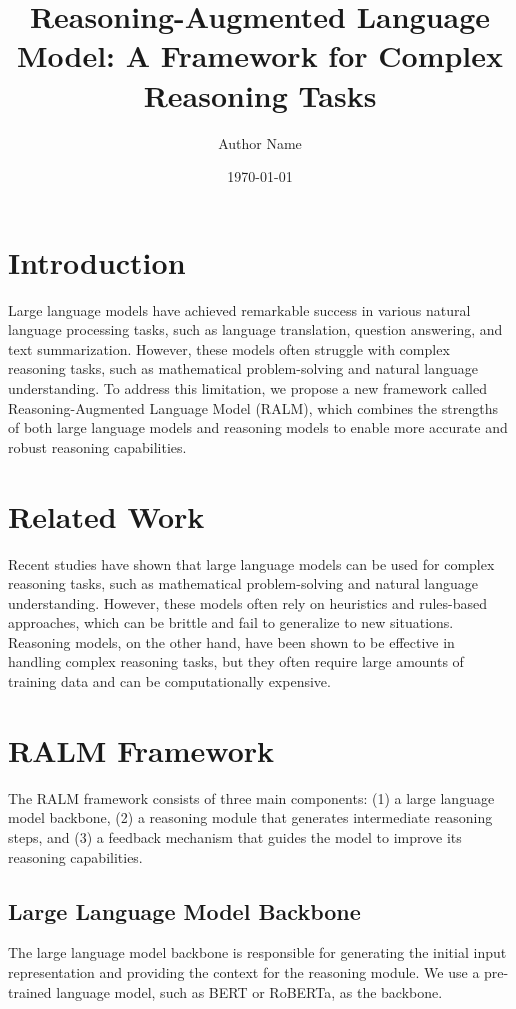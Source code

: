 \documentclass{article}
\title{Reasoning-Augmented Language Model: A Framework for Complex Reasoning Tasks}
\author{Author Name}
\date{\today}
\begin{document}
\maketitle

\section{Introduction}

Large language models have achieved remarkable success in various natural language processing tasks, such as language translation, question answering, and text summarization. However, these models often struggle with complex reasoning tasks, such as mathematical problem-solving and natural language understanding. To address this limitation, we propose a new framework called Reasoning-Augmented Language Model (RALM), which combines the strengths of both large language models and reasoning models to enable more accurate and robust reasoning capabilities.

\section{Related Work}

Recent studies have shown that large language models can be used for complex reasoning tasks, such as mathematical problem-solving and natural language understanding. However, these models often rely on heuristics and rules-based approaches, which can be brittle and fail to generalize to new situations. Reasoning models, on the other hand, have been shown to be effective in handling complex reasoning tasks, but they often require large amounts of training data and can be computationally expensive.

\section{RALM Framework}

The RALM framework consists of three main components: (1) a large language model backbone, (2) a reasoning module that generates intermediate reasoning steps, and (3) a feedback mechanism that guides the model to improve its reasoning capabilities.

\subsection{Large Language Model Backbone}

The large language model backbone is responsible for generating the initial input representation and providing the context for the reasoning module. We use a pre-trained language model, such as BERT or RoBERTa, as the backbone.
\end{document}
